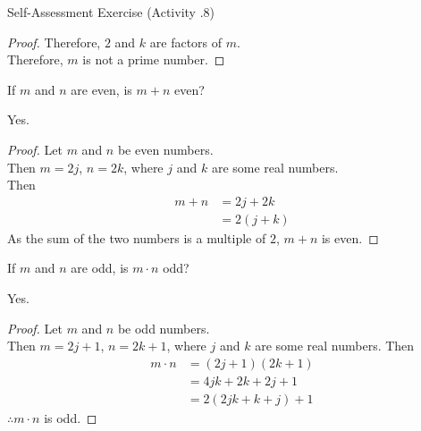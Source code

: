 \documentclass[\main/notes.tex]{subfiles}
\begin{document}
\begin{exercise}{Self-Assessment Exercise (Activity \thechapter.8)}
\begin{questions}
\begin{answer}
\begin{proof}
								Therefore, $2$ and $k$ are factors of $m$.\\
								Therefore, $m$ is not a prime number.
							\end{proof}
						\end{answer}
					\item If $m$ and $n$ are even, is $m + n$ even?\\
						\begin{answer}
							Yes.
							\begin{proof}
								Let $m$ and $n$ be even numbers.\\
								Then $m = 2j$, $n = 2k$, where $j$ and $k$ are some real numbers.\\
								Then
								\begin{align*}
									m + n &= 2j + 2k\\
									&= 2(j + k)
								\end{align*}
								As the sum of the two numbers is a multiple of $2$, $m + n$ is even.
							\end{proof}
						\end{answer}
					\pagebreak
					\item If $m$ and $n$ are odd, is $m \cdot n$ odd?\\
						\begin{answer}
							Yes.
							\begin{proof}
								Let $m$ and $n$ be odd numbers.\\
								Then $m = 2j + 1$, $n = 2k + 1$, where $j$ and $k$ are some real numbers.
								Then
								\begin{align*}
									m\cdot n &= (2j + 1)(2k + 1)\\
									&= 4jk + 2k + 2j + 1\\
									&= 2(2jk + k + j) + 1
								\end{align*}
								$\therefore m \cdot n$ is odd. 
							\end{proof}
						\end{answer}
				\end{questions}
			\end{exercise}
\end{document}
